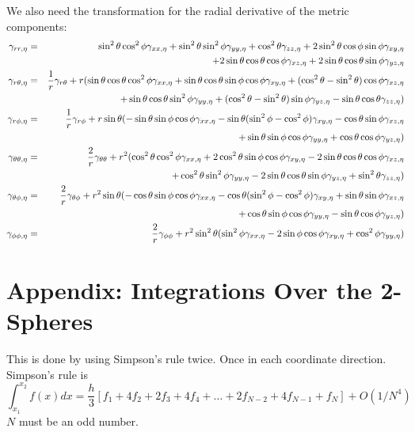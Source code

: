 \documentclass{article}
\begin{document}
We also need 
the transformation for the radial derivative of the metric components:
\begin{eqnarray*}
\gamma_{rr,\eta}&=&
\sin^2\theta\cos^2\phi\gamma_{xx,\eta}
+\sin^2\theta\sin^2\phi\gamma_{yy,\eta}
+\cos^2\theta\gamma_{zz,\eta}
+2\sin^2\theta\cos\phi\sin\phi\gamma_{xy,\eta}
\\
&&
+2\sin\theta\cos\theta\cos\phi\gamma_{xz,\eta}
+2\sin\theta\cos\theta\sin\phi\gamma_{yz,\eta}
\\
\gamma_{r\theta,\eta}&=& 
\frac{1}{r}\gamma_{r\theta}+
r(\sin\theta\cos\theta\cos^2\phi\gamma_{xx,\eta}
+\sin\theta\cos\theta\sin\phi\cos\phi\gamma_{xy,\eta}
+(\cos^2\theta-\sin^2\theta)\cos\phi\gamma_{xz,\eta}
\\
&&
+\sin\theta\cos\theta\sin^2\phi\gamma_{yy,\eta}
+(\cos^2\theta-\sin^2\theta)\sin\phi\gamma_{yz,\eta}
-\sin\theta\cos\theta\gamma_{zz,\eta})
\\
\gamma_{r\phi,\eta}&=&
\frac{1}{r}\gamma_{r\phi}+
r\sin\theta(-\sin\theta\sin\phi\cos\phi\gamma_{xx,\eta}
-\sin\theta(\sin^2\phi-\cos^2\phi)\gamma_{xy,\eta}
-\cos\theta\sin\phi\gamma_{xz,\eta}
\\
&&
+\sin\theta\sin\phi\cos\phi\gamma_{yy,\eta}
+\cos\theta\cos\phi\gamma_{yz,\eta})
\\
\gamma_{\theta\theta,\eta}&=&
\frac{2}{r}\gamma_{\theta\theta}+
r^2(\cos^2\theta\cos^2\phi\gamma_{xx,\eta}
+2\cos^2\theta\sin\phi\cos\phi\gamma_{xy,\eta}
-2\sin\theta\cos\theta\cos\phi\gamma_{xz,\eta}
\\
&&
+\cos^2\theta\sin^2\phi\gamma_{yy,\eta}
-2\sin\theta\cos\theta\sin\phi\gamma_{yz,\eta}
+\sin^2\theta\gamma_{zz,\eta})
\\
\gamma_{\theta\phi,\eta}&=&
\frac{2}{r}\gamma_{\theta\phi}+
r^2\sin\theta(-\cos\theta\sin\phi\cos\phi\gamma_{xx,\eta}
-\cos\theta(\sin^2\phi-\cos^2\phi)\gamma_{xy,\eta}
+\sin\theta\sin\phi\gamma_{xz,\eta}
\\
&&
+\cos\theta\sin\phi\cos\phi\gamma_{yy,\eta}
-\sin\theta\cos\phi\gamma_{yz,\eta})
\\
\gamma_{\phi\phi,\eta}&=&
\frac{2}{r}\gamma_{\phi\phi}+
r^2\sin^2\theta(\sin^2\phi\gamma_{xx,\eta}
-2\sin\phi\cos\phi\gamma_{xy,\eta}
+\cos^2\phi\gamma_{yy,\eta})
\end{eqnarray*}

\section{Appendix: Integrations Over the 2-Spheres}


This is done by using Simpson's rule twice. Once in each coordinate 
direction. Simpson's rule is
\begin{equation}
\int^{x_2}_{x_1} f(x) dx = 
  \frac{h}{3} [f_1+4f_2+2f_3+4f_4+\ldots+2f_{N-2}+4 f_{N-1}+f_N]
  +O(1/N^4)
\end{equation}
$N$ must be an odd number.
\end{document}
